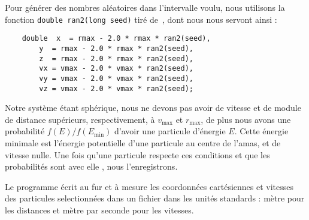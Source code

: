 Pour générer des nombres aléatoires dans l'intervalle voulu, nous utilisons la
fonction \verb|double ran2(long seed)| tiré de~\cite{NumericalRecipesC}, dont
nous nous servont ainsi :
\lstset{language=C, label=algo::tirage, frame=shadowbox}
\begin{lstlisting}
	double  x  = rmax - 2.0 * rmax * ran2(seed),
		y  = rmax - 2.0 * rmax * ran2(seed),
		z  = rmax - 2.0 * rmax * ran2(seed),
		vx = vmax - 2.0 * vmax * ran2(seed),
		vy = vmax - 2.0 * vmax * ran2(seed),
		vz = vmax - 2.0 * vmax * ran2(seed);
\end{lstlisting}
Notre système étant sphérique, nous ne devons pas avoir de vitesse et de module
de distance supérieurs, respectivement, à $v_{\mathrm{max}}$ et
$r_{\mathrm{max}}$, de plus nous avons une probabilité
\mbox{$f(E)/f(E_\mathrm{min})$}
d'avoir une particule d'énergie $E$. Cette énergie minimale est l'énergie
potentielle d'une particule au centre de l'amas, et de vitesse nulle.
Une fois qu'une particule respecte ces conditions et que \og les probabilités sont
avec elle \fg, nous l'enregistrons.

Le programme écrit au fur et à mesure les coordonnées cartésiennes et vitesses
des particules selectionnées dans un fichier dans les unités standards : mètre
pour les distances et mètre par seconde pour les vitesses.

